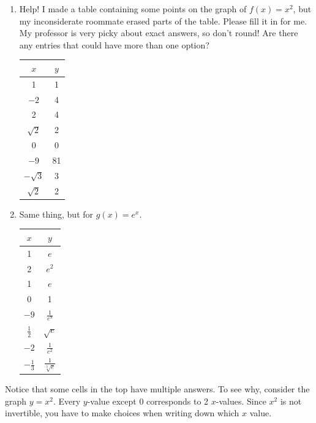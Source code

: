 \documentclass[noauthor]{ximera}
\begin{document}
\begin{problem}
    \begin{enumerate}
        \item Help! I made a table containing some points on the graph of \(f(x) = x^2\), but my inconsiderate roommate erased parts of the table. Please fill it in for me. My professor is very picky about exact answers, so don't round! Are there any entries that could have more than one option?
        \begin{center}
\begin{tabular}{|c|c|}
 \(x\) & \(y\) \\ \hline
 1 & 1 \\ 
 \(-2\) & 4 \\
 2 & 4 \\
 \(\sqrt{2}\) & 2 \\
 0 & 0\\
 \(-9\) & 81 \\
 \(-\sqrt{3}\) & 3 \\
 \(\sqrt{2}\) & 2\\
\end{tabular}
\end{center}
        \item Same thing, but for \(g(x) = e^x\).
                \begin{center}
\begin{tabular}{|c|c|}
 \(x\) & \(y\) \\ \hline
 1 &  \(e\)\\ 
 2 & \(e^2\) \\
 1 & \(e\) \\
 0 & 1 \\
 \(-9\) & \(\frac{1}{e^9}\)\\
 \(\frac{1}{2}\)& \(\sqrt{e}\) \\
  \(-2\)& \(\frac{1}{e^2}\) \\
  \(-\frac{1}{3}\) & \(\frac{1}{\sqrt[3]{e}}\)\\
\end{tabular}
\end{center}
    \end{enumerate}
\begin{explanation}
    Notice that some cells in the top have multiple answers. To see why, consider the graph \(y = x^2\).
    Every \(y\)-value except 0 corresponds to 2 \(x\)-values. Since \(x^2\) is not invertible, you have to make choices when writing down which \(x\) value.
\end{explanation}
\end{problem}
 
\end{document}
